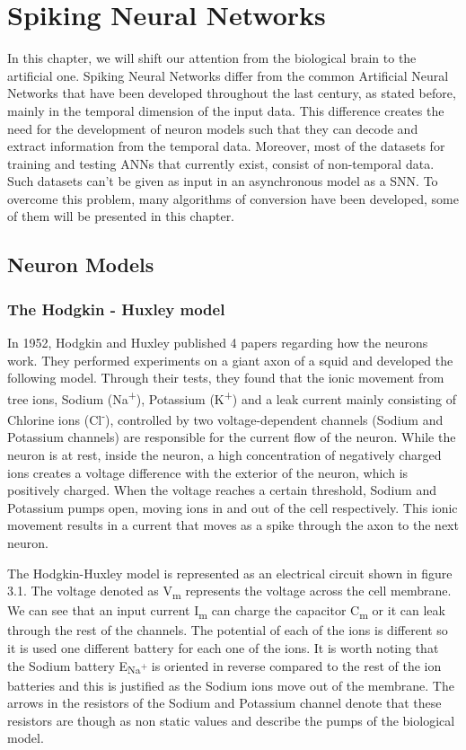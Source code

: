 \documentclass[12pt]{report}
\begin{document}
\chapter{Spiking Neural Networks}
In this chapter, we will shift our attention from the biological brain to the artificial one. Spiking Neural Networks differ from the common Artificial Neural Networks that have been developed throughout the last century, as stated before, mainly in the temporal dimension of the input data. This difference creates the need for the development of neuron models such that they can decode and extract information from the temporal data. Moreover, most of the datasets for training and testing ANNs that currently exist, consist of non-temporal data. Such datasets can't be given as input in an asynchronous model as a SNN. To overcome this problem, many algorithms of conversion have been developed, some of them will be presented in this chapter.
\section{Neuron Models}
\subsection{The Hodgkin - Huxley model}
In 1952, Hodgkin and Huxley published 4 papers regarding how the neurons work\cite{Johnson2017}. They performed experiments on a giant axon of a squid and developed the following model. Through their tests, they found that the ionic movement from tree ions, Sodium (Na\textsuperscript{+}), Potassium (K\textsuperscript{+}) and a leak current mainly consisting of Chlorine ions (Cl\textsuperscript{-}), controlled by two voltage-dependent channels (Sodium and Potassium channels) are responsible for the current flow of the neuron. While the neuron is at rest, inside the neuron, a high concentration of negatively charged ions creates a voltage difference with the exterior of the neuron, which is positively charged. When the voltage reaches a certain threshold, Sodium and Potassium pumps open, moving ions in and out of the cell respectively. This ionic movement results in a current that moves as a spike through the axon to the next neuron.

The Hodgkin-Huxley model is represented as an electrical circuit shown in figure 3.1. The voltage denoted as V\textsubscript{m} represents the voltage across the cell membrane. We can see that an input current I\textsubscript{m} can charge the capacitor C\textsubscript{m} or it can leak through the rest of the channels. The potential of each of the ions is different so it is used one different battery for each one of the ions. It is worth noting that the Sodium battery E\textsubscript{Na\textsuperscript{+}} is oriented in reverse compared to the rest of the ion batteries and this is justified as the Sodium ions move out of the membrane. The arrows in the resistors of the Sodium and Potassium channel denote that these resistors are though as non static values and describe the pumps of the biological model.
\end{document}
